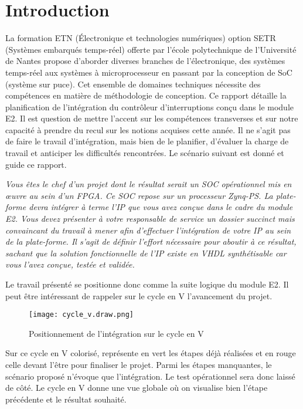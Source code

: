 \section{Introduction}

La formation ETN (Électronique et technologies numériques) option SETR (Systèmes embarqués temps-réel) offerte par l'école polytechnique de l'Université de Nantes propose d'aborder diverses branches de l'électronique, des systèmes temps-réel aux systèmes à microprocesseur en passant par la conception de SoC (système sur puce). 
Cet ensemble de domaines techniques nécessite des compétences en matière de méthodologie de conception. 
Ce rapport détaille la planification de l'intégration du contrôleur d'interruptions conçu dans le module E2.
Il est question de mettre l'accent sur les compétences transverses et sur notre capacité à prendre du recul sur les notions acquises cette année.
Il ne s'agit pas de faire le travail d'intégration, mais bien de le planifier, d'évaluer la charge de travail et anticiper les difficultés rencontrées.
Le scénario suivant est donné et guide ce rapport.

\gap

\textit{ Vous êtes le chef d'un projet dont le résultat serait un SOC opérationnel mis en œuvre au sein d’un FPGA. 
Ce SOC repose sur un processeur Zynq-PS. 
La plate-forme devra intégrer à terme l'IP que vous avez conçue dans le cadre du module E2. 
Vous devez présenter à votre responsable de service un dossier succinct mais convaincant du travail à mener afin d’effectuer l’intégration de votre IP au sein de la plate-forme. 
Il s’agit de définir l'effort nécessaire pour aboutir à ce résultat, sachant que la solution fonctionnelle de l'IP existe en VHDL synthétisable car vous l'avez conçue, testée et validée.}

\gap

Le travail présenté se positionne donc comme la suite logique du module E2.
Il peut être intéressant de rappeler sur le cycle en V l'avancement du projet.
\begin{figure}[H]
    \centering
    \texttt{[image: cycle\_v.draw.png]}
    \caption{Positionnement de l'intégration sur le cycle en V}
    \label{fig:cycle_v}
\end{figure}
Sur ce cycle en V colorisé, représente en vert les étapes déjà réalisées et en rouge celle devant l'être pour finaliser le projet.
Parmi les étapes manquantes, le scénario proposé n'évoque que l'intégration.
Le test opérationnel sera donc laissé de côté.
Le  cycle en V donne une vue globale où on visualise bien l'étape précédente et le résultat souhaité.



